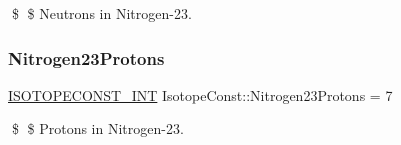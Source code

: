 \$ \$ Neutrons in Nitrogen-\/23. \mbox{\label{group___isotope_const-_nitrogen-_n23_gaf52f95afe3508784c4499870ad0332c9}} 
\subsubsection{\texorpdfstring{Nitrogen23\+Protons}{Nitrogen23Protons}}
{\footnotesize\ttfamily \mbox{\hyperlink{group___isotope_const-_macros_ga5f18360b3e99483a35c32d789e62621c}{I\+S\+O\+T\+O\+P\+E\+C\+O\+N\+S\+T\+\_\+\+I\+NT}} Isotope\+Const\+::\+Nitrogen23\+Protons = 7}

\$ \$ Protons in Nitrogen-\/23. 
